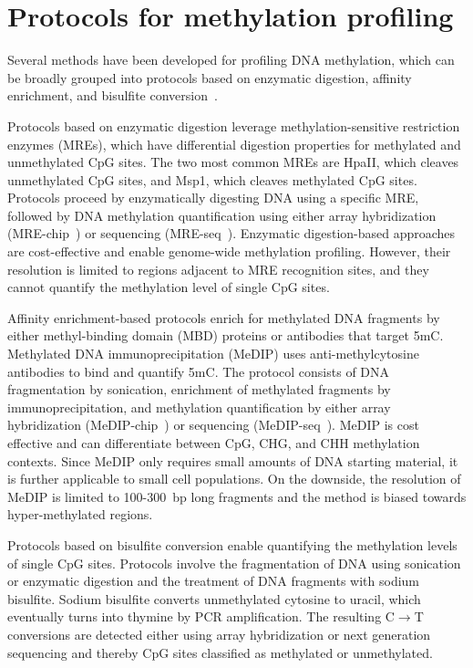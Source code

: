 \section{Protocols for methylation profiling} \label{sec:intro_proto}

Several methods have been developed for profiling DNA methylation, which can be broadly grouped into protocols based on enzymatic digestion, affinity enrichment, and bisulfite conversion~\citep{yong_profiling_2016,schwartzman_single-cell_2015,plongthongkum_advances_2014,huang_profiling_2010,laird_principles_2010-1}.

Protocols based on enzymatic digestion leverage methylation-sensitive restriction enzymes (MREs), which have differential digestion properties for methylated and unmethylated CpG sites. The two most common MREs are HpaII, which cleaves unmethylated CpG sites, and Msp1, which cleaves methylated CpG sites. Protocols proceed by enzymatically digesting DNA using a specific MRE, followed by DNA methylation quantification using either array hybridization (MRE-chip~\citep{chittur_help_2010}) or sequencing (MRE-seq~\citep{maunakea_conserved_2010}). Enzymatic digestion-based approaches are cost-effective and enable genome-wide methylation profiling. However, their resolution is limited to regions adjacent to MRE recognition sites, and they cannot quantify the methylation level of single CpG sites.

Affinity enrichment-based protocols enrich for methylated DNA fragments by either methyl-binding domain (MBD) proteins or antibodies that target 5mC. Methylated DNA immunoprecipitation (MeDIP) uses anti-methylcytosine antibodies to bind and quantify 5mC. The protocol consists of DNA fragmentation by sonication, enrichment of methylated fragments by immunoprecipitation, and methylation quantification by either array hybridization (MeDIP-chip~\citep{park-sarge_methylated_2009}) or sequencing (MeDIP-seq~\citep{brinkman_whole-genome_2010}). MeDIP is cost effective and can differentiate between CpG, CHG, and CHH methylation contexts. Since MeDIP only requires small amounts of DNA starting material, it is further applicable to small cell populations. On the downside, the resolution of MeDIP is limited to 100-300~bp long fragments and the method is biased towards hyper-methylated regions.

Protocols based on bisulfite conversion enable quantifying the methylation levels of single CpG sites. Protocols involve the fragmentation of DNA using sonication or enzymatic digestion and the treatment of DNA fragments with sodium bisulfite. Sodium bisulfite converts unmethylated cytosine to uracil, which eventually turns into thymine by PCR amplification. The resulting C$\rightarrow$T conversions are detected either using array hybridization or next generation sequencing and thereby CpG sites classified as methylated or unmethylated.

